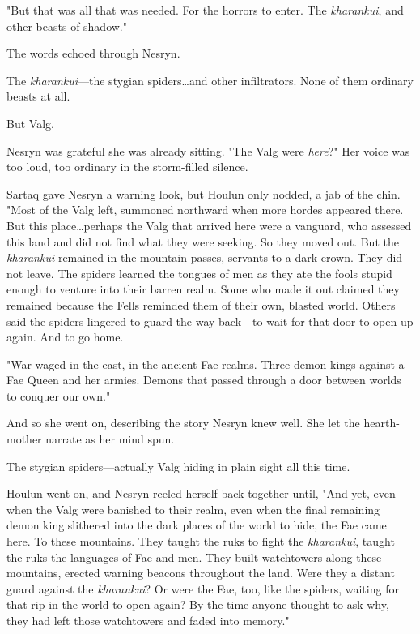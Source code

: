 "But that was all that was needed.
For the horrors to enter.
The \emph{kharankui}, and other beasts of shadow."

The words echoed through Nesryn.

The \emph{kharankui}---the stygian spiders\ldots and other infiltrators.
None of them ordinary beasts at all.

But Valg.

Nesryn was grateful she was already sitting.
"The Valg were \emph{here}?"
Her voice was too loud, too ordinary in the storm-filled silence.

Sartaq gave Nesryn a warning look, but Houlun only nodded, a jab of the chin.
"Most of the Valg left, summoned northward when more hordes appeared there.
But this place\ldots perhaps the Valg that arrived here were a vanguard, who assessed this land and did not find what they were seeking.
So they moved out.
But the \emph{kharankui} remained in the mountain passes, servants to a dark crown.
They did not leave.
The spiders learned the tongues of men as they ate the fools stupid enough to venture into their barren realm.
Some who made it out claimed they remained because the Fells reminded them of their own, blasted world.
Others said the spiders lingered to guard the way back---to wait for that door to open up again.
And to go home.

"War waged in the east, in the ancient Fae realms.
Three demon kings against a Fae Queen and her armies.
Demons that passed through a door between worlds to conquer our own."

And so she went on, describing the story Nesryn knew well.
She let the hearth-mother narrate as her mind spun.

The stygian spiders---actually Valg hiding in plain sight all this time.

Houlun went on, and Nesryn reeled herself back together until, "And yet, even when the Valg were banished to their realm, even when the final remaining demon king slithered into the dark places of the world to hide, the Fae came here.
To these mountains.
They taught the ruks to fight the \emph{kharankui}, taught the ruks the languages of Fae and men.
They built watchtowers along these mountains, erected warning beacons throughout the land.
Were they a distant guard against the \emph{kharankui}?
Or were the Fae, too, like the spiders, waiting for that rip in the world to open again?
By the time anyone thought to ask why, they had left those watchtowers and faded into memory."

